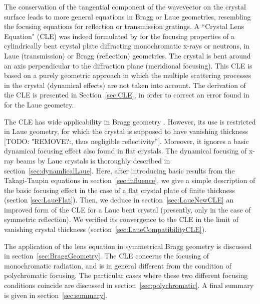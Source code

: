 \documentclass[preprint]{iucr}              %
\newcommand{\todo}[1]{{\color{red}[TODO: "#1'']}}
\newcommand{\inred}[1]{{\color{red}#1}}
\begin{document}
The conservation of the tangential component of the wavevector on the crystal surface leads to more general equations in Bragg or Laue geometries, resembling the focusing equations for reflection or transmission gratings.
A ``Crystal Lens Equation" (CLE) was indeed formulated by \cite{CK} for the focusing properties of a cylindrically bent crystal plate diffracting monochromatic x-rays or neutrons, in Laue (transmission) or Bragg (reflection) geometries. The crystal is bent around an axis perpendicular to the diffraction plane (meridional focusing). This CLE is based on a purely geometric approach in which the multiple scattering processes in the crystal (dynamical effects) are not taken into account. 
The derivation of the CLE is presented in Section~\ref{sec:CLE}, \inred{in order to correct an error} found in \cite{CK} for the Laue geometry.

The CLE has wide applicability in Bragg geometry \cite{Caciuffo1987}. However, \inred{its use} is restricted in Laue geometry, \inred{for which the crystal is supposed to have} vanishing thickness \todo{REMOVE?:, thus negligible reflectivity}. Moreover, it \inred{ignores} a \inred{basic} dynamical focusing effect \inred{also found in flat crystals}.
The \inred{dynamical} focusing of x-ray beams by Laue crystals
is  thoroughly described in section~\ref{sec:dynamlicalLaue}. Here, after introducing basic results from the Takagi-Taupin equations in section~\ref{sec:influence}, we give a simple description of the \inred{basic} focusing effect in the case of a flat crystal plate of finite thickness (section \ref{sec:LaueFlat}). Then, we deduce in section~\ref{sec:LaueNewCLE} an improved form of the CLE for a Laue bent crystal (presently, only in the case of symmetric reflection). We verified its convergence to the CLE in the limit of vanishing crystal thickness (section~\ref{sec:LaueCompatibilityCLE}). 

The application of the lens equation in symmetrical Bragg geometry is discussed in section~\ref{sec:BraggGeometry}. %
The CLE concerns the focusing of monochromatic radiation, and is in general different from the condition of polychromatic focusing. The particular cases where these two different focusing conditions coincide are discussed in section~\ref{sec:polychromatic}. A final summary is given in section~\ref{sec:summary}.   
\end{document}
